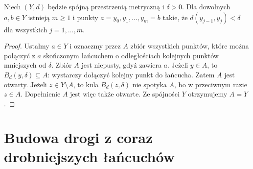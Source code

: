 \begin{lemat}
\label{lem:topog26-chain}
Niech \((Y,d)\) będzie spójną przestrzenią metryczną
i \(\delta>0\). Dla dowolnych \(a,b\in Y\)
istnieją \(m\ge1\) i punkty
\(a=y_0,y_1,\ldots,y_m=b\)
takie, że \(d(y_{j-1},y_j)<\delta\)
dla wszystkich \(j=1,\ldots,m\).
\end{lemat}
\begin{proof}
Ustalmy \(a\in Y\) i oznaczmy przez \(A\)
zbiór wszystkich punktów, które można
połączyć z \(a\) skończonym łańcuchem
o odległościach kolejnych punktów
mniejszych od \(\delta\).
Zbiór \(A\) jest niepusty, gdyż zawiera \(a\).
Jeżeli \(y\in A\), to \(B_d(y,\delta)\subseteq A\):
wystarczy dołączyć kolejny punkt do łańcucha.
Zatem \(A\) jest otwarty.
Jeżeli \(z\in Y\setminus A\), to kula
\(B_d(z,\delta)\) nie spotyka \(A\),
bo w przeciwnym razie \(z\in A\).
Dopełnienie \(A\) jest więc także otwarte.
Ze spójności \(Y\) otrzymujemy \(A=Y\).
\end{proof}

\section{Budowa drogi z coraz drobniejszych łańcuchów}
\label{sec:topog26-paths}

